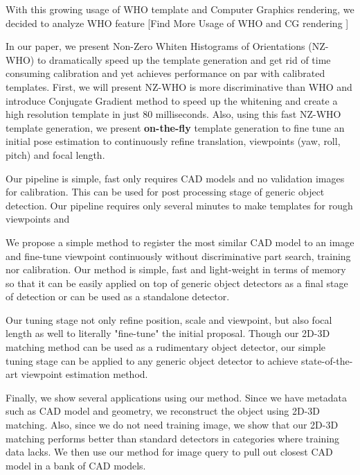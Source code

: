 With this growing usage of WHO template and Computer Graphics rendering, we decided to analyze WHO feature
[Find More Usage of WHO and CG rendering \cite{Pepik12}]

In our paper, we present Non-Zero Whiten Histograms of Orientations (NZ-WHO) to dramatically speed up the template generation and get rid of time consuming calibration and yet achieves performance on par with calibrated templates. First, we will present NZ-WHO is more discriminative than WHO and introduce Conjugate Gradient method to speed up the whitening and create a high resolution template in just 80 milliseconds. Also, using this fast NZ-WHO template generation, we present \textbf{on-the-fly} template generation to fine tune an initial pose estimation to continuously refine translation, viewpoints (yaw, roll, pitch) and focal length.

Our pipeline is simple, fast only requires CAD models and no validation images for calibration. This can be used for post processing stage of generic object detection. Our pipeline requires only several minutes to make templates for rough viewpoints and 

We propose a simple method to register the most similar CAD model to an image and fine-tune viewpoint continuously without discriminative part search, training nor calibration. Our method is simple, fast and light-weight in terms of memory so that it can be easily applied on top of generic object detectors as a final stage of detection or can be used as a standalone detector. 



Our tuning stage not only refine position, scale and viewpoint, but also focal length as well to literally "fine-tune" the initial proposal. Though our 2D-3D matching method can be used as a rudimentary object detector, our simple tuning stage can be applied to any generic object detector to achieve state-of-the-art viewpoint estimation method.

Finally, we show several applications using our method. Since we have metadata such as CAD model and geometry, we reconstruct the object using 2D-3D matching. Also, since we do not need training image, we show that our 2D-3D matching performs better than standard detectors in categories where training data lacks. We then use our method for image query to pull out closest CAD model in a bank of CAD models.

